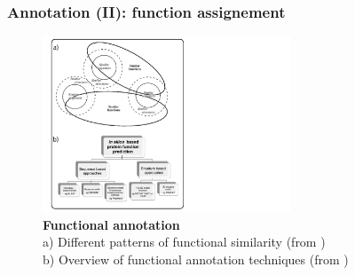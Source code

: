 \subsubsection*{Annotation (II): function assignement}
\begin{figure}[!tb]
	\center
    \includegraphics[width=0.66\textwidth]{figures/Introduction/thesis_3}
	\caption{\label{fig:funcannotation}\textbf{Functional annotation}\\
			a) Different patterns of functional similarity (from \cite{whisstock2003prediction}) \\
			b) Overview of functional annotation techniques (from \cite{sleator2010overview})}
\end{figure}

